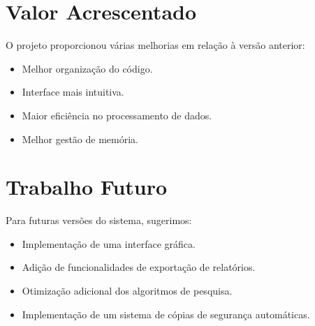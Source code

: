 \documentclass[a4paper,12pt]{report}
\begin{document}
\section{Valor Acrescentado}
O projeto proporcionou várias melhorias em relação à versão anterior:
\begin{itemize}
    \item Melhor organização do código.
    \item Interface mais intuitiva.
    \item Maior eficiência no processamento de dados.
    \item Melhor gestão de memória.
\end{itemize}

\section{Trabalho Futuro}
Para futuras versões do sistema, sugerimos:
\begin{itemize}
    \item Implementação de uma interface gráfica.
    \item Adição de funcionalidades de exportação de relatórios.
    \item Otimização adicional dos algoritmos de pesquisa.
    \item Implementação de um sistema de cópias de segurança automáticas.
\end{itemize}
\end{document}
